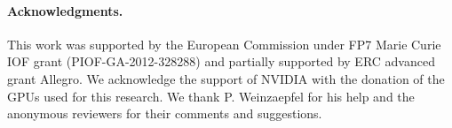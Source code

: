 \documentclass{article}
\begin{document}
\paragraph{\bf Acknowledgments.}This work was supported by the European Commission under FP7 Marie Curie IOF grant (PIOF-GA-2012-328288) and partially supported by ERC advanced  grant Allegro.
We acknowledge the support of NVIDIA with the donation of the GPUs
used for this research. 
We thank P. Weinzaepfel for his help and the anonymous reviewers for their comments and suggestions.



 
\footnotesize


\end{document}
